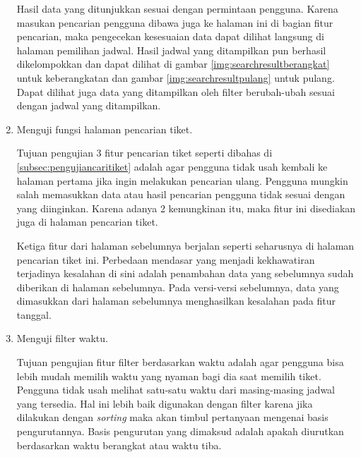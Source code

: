 \begin{enumerate}
        Hasil data yang ditunjukkan sesuai dengan permintaan pengguna. Karena masukan pencarian pengguna dibawa juga ke halaman ini di bagian fitur pencarian, maka pengecekan kesesuaian data dapat dilihat langsung di halaman pemilihan jadwal. Hasil jadwal yang ditampilkan pun berhasil dikelompokkan dan dapat dilihat di gambar \ref{img:searchresultberangkat} untuk keberangkatan dan gambar \ref{img:searchresultpulang} untuk pulang. Dapat dilihat juga data yang ditampilkan oleh filter berubah-ubah sesuai dengan jadwal yang ditampilkan.
        
        \item Menguji fungsi halaman pencarian tiket.
        
        Tujuan pengujian 3 fitur pencarian tiket seperti dibahas di \ref{subsec:pengujiancaritiket} adalah agar pengguna tidak usah kembali ke halaman pertama jika ingin melakukan pencarian ulang. Pengguna mungkin salah memasukkan data atau hasil pencarian pengguna tidak sesuai dengan yang diinginkan. Karena adanya 2 kemungkinan itu, maka fitur ini disediakan juga di halaman pencarian tiket.
        
        Ketiga fitur dari halaman sebelumnya berjalan seperti seharusnya di halaman pencarian tiket ini. Perbedaan mendasar yang menjadi kekhawatiran terjadinya kesalahan di sini adalah penambahan data yang sebelumnya sudah diberikan di halaman sebelumnya. Pada versi-versi sebelumnya, data yang dimasukkan dari halaman sebelumnya menghasilkan kesalahan pada fitur tanggal.
        
        \item Menguji filter waktu.
        
        Tujuan pengujian fitur filter berdasarkan waktu adalah agar pengguna bisa lebih mudah memilih waktu yang nyaman bagi dia saat memilih tiket. Pengguna tidak usah melihat satu-satu waktu dari masing-masing jadwal yang tersedia. Hal ini lebih baik digunakan dengan filter karena jika dilakukan dengan \textit{sorting} maka akan timbul pertanyaan mengenai basis pengurutannya. Basis pengurutan yang dimaksud adalah apakah diurutkan berdasarkan waktu berangkat atau waktu tiba.
        

\end{enumerate}
